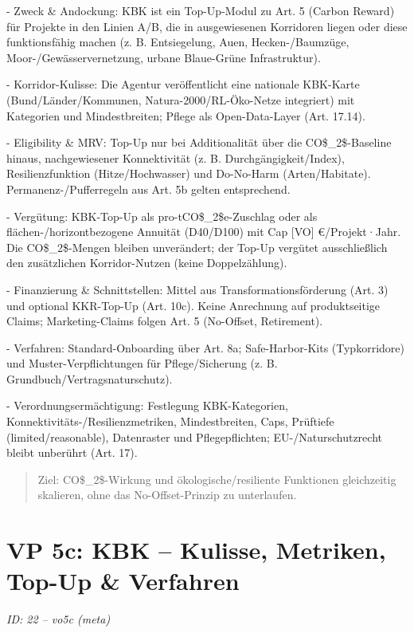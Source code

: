 \documentclass[12pt,a4paper]{scrartcl}
\begin{document}
- Zweck \& Andockung: KBK ist ein Top-Up-Modul zu Art. 5 (Carbon Reward) für Projekte in den Linien A/B, die in ausgewiesenen Korridoren liegen oder diese funktionsfähig machen (z. B. Entsiegelung, Auen, Hecken-/Baumzüge, Moor-/Gewässervernetzung, urbane Blaue-Grüne Infrastruktur).

- Korridor-Kulisse: Die Agentur veröffentlicht eine nationale KBK-Karte (Bund/Länder/Kommunen, Natura-2000/RL-Öko-Netze integriert) mit Kategorien und Mindestbreiten; Pflege als Open-Data-Layer (Art. 17.14).

- Eligibility \& MRV: Top-Up nur bei Additionalität über die CO\$\_2\$-Baseline hinaus, nachgewiesener Konnektivität (z. B. Durchgängigkeit/Index), Resilienzfunktion (Hitze/Hochwasser) und Do-No-Harm (Arten/Habitate). Permanenz-/Pufferregeln aus Art. 5b gelten entsprechend.

- Vergütung: KBK-Top-Up als pro-tCO\$\_2\$e-Zuschlag oder als flächen-/horizontbezogene Annuität (D40/D100) mit Cap [VO] €/Projekt·Jahr. Die CO\$\_2\$-Mengen bleiben unverändert; der Top-Up vergütet ausschließlich den zusätzlichen Korridor-Nutzen (keine Doppelzählung).

- Finanzierung \& Schnittstellen: Mittel aus Transformationsförderung (Art. 3) und optional KKR-Top-Up (Art. 10c). Keine Anrechnung auf produktseitige Claims; Marketing-Claims folgen Art. 5 (No-Offset, Retirement).

- Verfahren: Standard-Onboarding über Art. 8a; Safe-Harbor-Kits (Typkorridore) und Muster-Verpflichtungen für Pflege/Sicherung (z. B. Grundbuch/Vertragsnaturschutz).

- Verordnungsermächtigung: Festlegung KBK-Kategorien, Konnektivitäts-/Resilienzmetriken, Mindestbreiten, Caps, Prüftiefe (limited/reasonable), Datenraster und Pflegepflichten; EU-/Naturschutzrecht bleibt unberührt (Art. 17).

{\footnotesize\begin{quote}
Ziel: CO\$\_2\$-Wirkung und ökologische/resiliente Funktionen gleichzeitig skalieren, ohne das No-Offset-Prinzip zu unterlaufen.
\end{quote}}



\section[VP 5c: KBK -- Kulisse, Metriken, Top-Up \& Verfahren]{VP 5c: KBK -- Kulisse, Metriken, Top-Up \& Verfahren}
\noindent\textit{ID: 22 -- vo5c (meta)}
\end{document}
